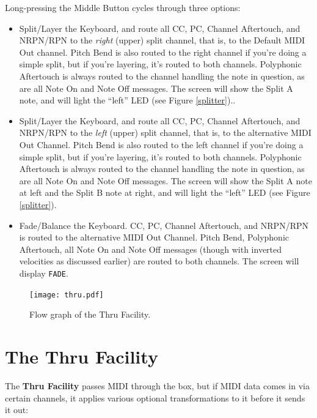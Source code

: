 \documentclass{article}
\begin{document}
Long-pressing the Middle Button cycles through three options:
\begin{itemize}
\item Split/Layer the Keyboard, and route all CC, PC, Channel Aftertouch, and NRPN/RPN to the {\it right} (upper) split channel, that is, to the Default MIDI Out channel.  Pitch Bend is also routed to the right channel if you're doing a simple split, but if you're layering, it's routed to both channels.  Polyphonic Aftertouch is always routed to the channel handling the note in question, as are all Note On and Note Off messages.  The screen will show the Split A note, and will light the ``left'' LED (see Figure \ref{splitter})..
\item Split/Layer the Keyboard, and route all CC, PC, Channel Aftertouch, and NRPN/RPN to the {\it left} (upper) split channel, that is, to the alternative MIDI Out Channel.  Pitch Bend is also routed to the left channel if you're doing a simple split, but if you're layering, it's routed to both channels.  Polyphonic Aftertouch is always routed to the channel handling the note in question, as are all Note On and Note Off messages.  The screen will show the Split A note at left and the Split B note at right, and will light the ``left'' LED (see Figure \ref{splitter}).
\item Fade/Balance the Keyboard.  CC, PC, Channel Aftertouch, and NRPN/RPN is routed to the alternative MIDI Out Channel.  Pitch Bend, Polyphonic Aftertouch, all Note On and Note Off messages (though with inverted velocities as discussed earlier) are routed to both channels.  The screen will display \texttt{FADE}.
\end{itemize}


\clearpage
\begin{figure}[h!]
\vspace{-1em}\texttt{[image: thru.pdf]}
\vspace{-1.25em}
\caption{Flow graph of the Thru Facility.}
\vspace{-0.5em}
\end{figure}

\section{The Thru Facility}
\label{thru}

The {\bf Thru Facility} passes MIDI through the box, but if MIDI data comes in via certain channels, it applies various optional transformations to it before it sends it out:
\end{document}
